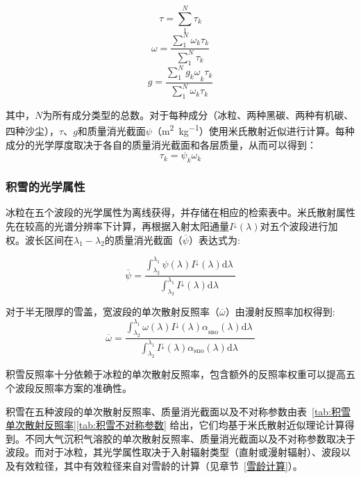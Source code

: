 \begin{equation}
  \tau = \sum_{1}^{N}\tau_{k}
\end{equation}
%
\begin{equation}
  \omega = \frac{\sum_{1}^{N}\omega_{k}\tau_{k}}{\sum_{1}^{N}\tau_{k}}
\end{equation}
%
\begin{equation}
  g = \frac{\sum_{1}^{N}{g_{k}\omega}_{k}\tau_{k}}{\sum_{1}^{N}\omega_{k}\tau_{k}}
\end{equation}

其中，$N$为所有成分类型的总数。对于每种成分（冰粒、两种黑碳、两种有机碳、四种沙尘），$\tau$、$g$和质量消光截面$\psi$（\unit{m^2.kg^{-1}}）使用米氏散射近似进行计算。每种成分的光学厚度取决于各自的质量消光截面和各层质量，从而可以得到：
\begin{equation}
  \tau_{k} = \psi_{k}\omega_{k}
\end{equation}

\subsubsection{积雪的光学属性}
冰粒在五个波段的光学属性为离线获得，并存储在相应的检索表中。米氏散射属性先在较高的光谱分辨率下计算，再根据入射太阳通量\(I^{\downarrow}(\lambda)\)对五个波段进行加权。波长区间在$\lambda_{1}-\lambda_{2}$的质量消光截面（\(\overline{\psi}\)）表达式为:

\begin{equation}
  \overline{\psi} = \frac{\int_{\lambda_{2}}^{\lambda_{1}}{\psi(\lambda)I^{\downarrow}(\lambda){\mathrm d}\lambda\ }}{\int_{\lambda_{2}}^{\lambda_{1}}{I^{\downarrow}(\lambda){\mathrm d}\lambda\ }}
\end{equation}

对于半无限厚的雪盖，宽波段的单次散射反照率（\(\overline{\omega}\)）由漫射反照率加权得到:
\begin{equation}
  \overline{\omega} = \frac{\int_{\lambda_{2}}^{\lambda_{1}}{\omega(\lambda){I^{\downarrow}(\lambda)\alpha}_{\mathrm{sno}}(\lambda){\mathrm d}\lambda\ }}{\int_{\lambda_{2}}^{\lambda_{1}}{I^{\downarrow}(\lambda)\alpha_{\mathrm{sno}}(\lambda){\mathrm d}\lambda\ }}
\end{equation}

积雪反照率十分依赖于冰粒的单次散射反照率，包含额外的反照率权重可以提高五个波段反照率方案的准确性\citep{flanner2007PresentdayClimateForcing}。

积雪在五种波段的单次散射反照率、质量消光截面以及不对称参数由表~\ref{tab:积雪单次散射反照率}\text{--}\ref{tab:积雪不对称参数} 给出，它们均基于米氏散射近似理论计算得到。不同大气沉积气溶胶的单次散射反照率、质量消光截面以及不对称参数取决于波段。而对于冰粒，其光学属性取决于入射辐射类型（直射或漫射辐射）、波段以及有效粒径，其中有效粒径来自对雪龄的计算（见章节~\ref{雪龄计算}）。

